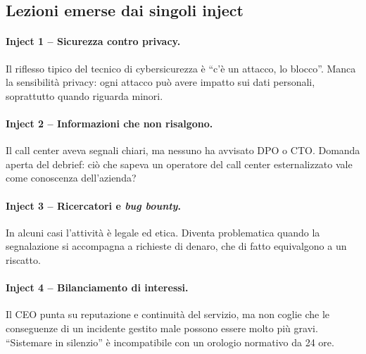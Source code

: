 \subsection{Lezioni emerse dai singoli inject}

\paragraph{Inject 1 -- Sicurezza contro privacy.} Il riflesso tipico del tecnico di cybersicurezza è
``c'è un attacco, lo blocco''. Manca la sensibilità privacy: ogni attacco può avere impatto sui dati
personali, soprattutto quando riguarda minori.

\paragraph{Inject 2 -- Informazioni che non risalgono.} Il call center aveva segnali chiari, ma
nessuno ha avvisato DPO o CTO. Domanda aperta del debrief: ciò che sapeva un operatore del call
center esternalizzato vale come conoscenza dell'azienda?

\paragraph{Inject 3 -- Ricercatori e \emph{bug bounty}.} In alcuni casi l'attività è legale ed etica.
Diventa problematica quando la segnalazione si accompagna a richieste di denaro, che di fatto
equivalgono a un riscatto.

\paragraph{Inject 4 -- Bilanciamento di interessi.} Il CEO punta su reputazione e continuità del
servizio, ma non coglie che le conseguenze di un incidente gestito male possono essere molto più
gravi. ``Sistemare in silenzio'' è incompatibile con un orologio normativo da 24 ore.


